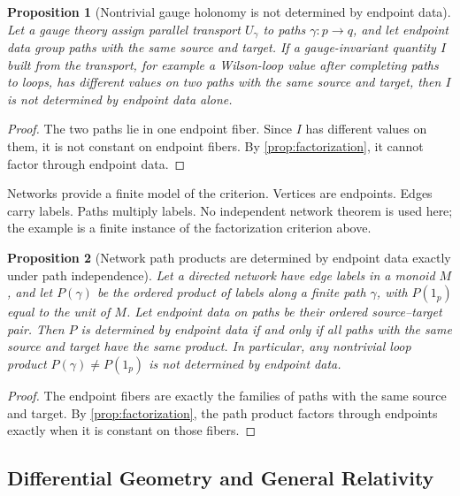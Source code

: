 \documentclass[12pt]{article}
\newtheorem{proposition}[proposition]{Proposition}
\begin{document}
\begin{proposition}[Nontrivial gauge holonomy is not determined by endpoint data]
\label{prop:gauge-realization}
Let a gauge theory assign parallel transport $U_\gamma$ to paths
$\gamma:p\to q$, and let endpoint data group paths with the same source
and target. If a gauge-invariant quantity $I$ built from the
transport, for example a Wilson-loop value after completing paths to loops,
has different values on two paths with the same source and target, then
$I$ is not determined by endpoint data alone.
\end{proposition}

\begin{proof}
The two paths lie in one endpoint fiber. Since $I$ has different values
on them, it is not constant on endpoint fibers. By
\cref{prop:factorization}, it cannot factor through endpoint data.
\end{proof}

Networks provide a finite model of the criterion. Vertices are
endpoints. Edges carry labels. Paths multiply labels. No independent
network theorem is used here; the example is a finite instance of the
factorization criterion above.

\begin{proposition}[Network path products are determined by endpoint data exactly
under path independence]
\label{prop:network-realization}
Let a directed network have edge labels in a monoid $M$, and let
$P(\gamma)$ be the ordered product of labels along a finite path
$\gamma$, with $P(1_p)$ equal to the unit of $M$. Let endpoint data on
paths be their ordered source--target pair. Then $P$ is determined by
endpoint data if and only if all paths with the same source and target
have the same product. In particular, any nontrivial loop product
$P(\gamma)\neq P(1_p)$ is not determined by endpoint data.
\end{proposition}

\begin{proof}
The endpoint fibers are exactly the families of paths with the same
source and target. By
\cref{prop:factorization}, the path product factors through endpoints
exactly when it is constant on those fibers.
\end{proof}

\subsection{Differential Geometry and General Relativity}
\label{subsec:geometry-gr}
\end{document}
